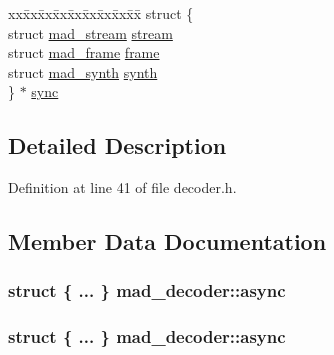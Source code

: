 \begin{DoxyCompactItemize}
\begin{tabbing}
\end{tabbing}\item 
\begin{tabbing}
xx\=xx\=xx\=xx\=xx\=xx\=xx\=xx\=xx\=\kill
struct \{\\
\>struct \hyperlink{structmad__stream}{mad\_stream} \hyperlink{structmad__decoder_a4d0b89b70cb6bbc3172a222ba9c751d1}{stream}\\
\>struct \hyperlink{structmad__frame}{mad\_frame} \hyperlink{structmad__decoder_a35cf3f7b3aaa4336718ff1896808bd70}{frame}\\
\>struct \hyperlink{structmad__synth}{mad\_synth} \hyperlink{structmad__decoder_a7fda021db48c654ff0db728dd5c040a3}{synth}\\
\} $\ast$ \hyperlink{structmad__decoder_a40b36ee850dfdf7317fa2e7ac3377450}{sync}\\

\end{tabbing}\end{DoxyCompactItemize}


\subsection{Detailed Description}


Definition at line 41 of file decoder.\+h.



\subsection{Member Data Documentation}
\subsubsection[{\texorpdfstring{async}{async}}]{\setlength{\rightskip}{0pt plus 5cm}struct \{ ... \}   mad\+\_\+decoder\+::async}\hypertarget{structmad__decoder_a18bc16b02d6ef1f04d6c5d3e63222a37}{}\label{structmad__decoder_a18bc16b02d6ef1f04d6c5d3e63222a37}
\subsubsection[{\texorpdfstring{async}{async}}]{\setlength{\rightskip}{0pt plus 5cm}struct \{ ... \}   mad\+\_\+decoder\+::async}\hypertarget{structmad__decoder_a7ccfe7f881b1f830c4ce15dd9640b779}{}\label{structmad__decoder_a7ccfe7f881b1f830c4ce15dd9640b779}
